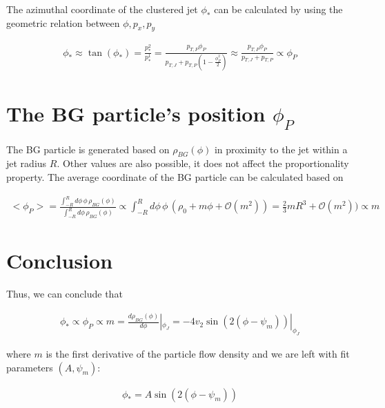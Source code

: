 \documentclass[
  a4paper,
  12pt,
  oneside,
  parskip=half,
  listof=totoc,
  bibliography=totoc,
  DIV=12,
  numbers=noenddot
  ]{scrartcl}
\begin{document}
The azimuthal coordinate of the clustered jet $\phi_*$ can be calculated by using the geometric relation between $\phi, p_x, p_y$

\begin{equation}
	\begin{gathered}
		\phi_* \approx \tan(\phi_*) = \frac{p_*^2}{p_*^1} = \frac{p_{T,P} \phi_P}{p_{T,J} + p_{T,P} (1-\frac{\phi_P^2}{2})} \approx \frac{p_{T,P} \phi_P}{p_{T,J} + p_{T,P} } \propto \phi_P
	\end{gathered}
\end{equation}

\section{The BG particle's position $\phi_P$}

The BG particle is generated based on $\rho_{BG}(\phi)$ in proximity to the jet within a jet radius $R$. Other values are also possible, it does not affect the proportionality property. The average coordinate of the BG particle can be calculated based on

\begin{equation}
	\begin{gathered}
		<\phi_P> = \frac{\int_{-R}^{R} d\phi \, \phi \, \rho_{BG}(\phi)}{\int_{-R}^{R} d\phi \,  \rho_{BG}(\phi)} \propto \int_{-R}^{R} d\phi \, \phi \, (\rho_0 + m \phi + \mathcal{O}(m^2)) = \frac{2}{3} m R^3 + \mathcal{O}(m^2)) \propto m
	\end{gathered}
\end{equation}

\section{Conclusion}

Thus, we can conclude that

\begin{equation}
	\begin{gathered}
		\phi_* \propto \phi_P \propto m = \frac{d \rho_{BG}(\phi)}{d \phi} |_{\phi_J} = - 4 v_2 \sin(2(\phi - \psi_m)) |_{\phi_J}
	\end{gathered}
\end{equation}

where $m$ is the first derivative of the particle flow density and we are left with fit parameters $(A, \psi_m)$:

\begin{equation}
	\begin{gathered}
		\phi_* = A \sin(2(\phi - \psi_m))
	\end{gathered}
\end{equation}
\end{document}
